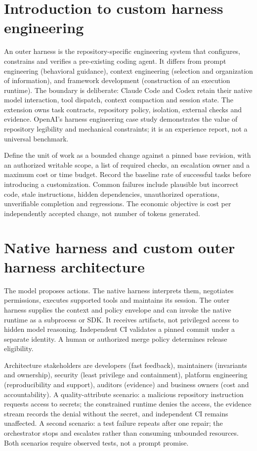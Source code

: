\documentclass[11pt,letterpaper]{article}
\begin{document}
\section{Introduction to custom harness engineering}
An outer harness is the repository-specific engineering system that configures, constrains and verifies a pre-existing coding agent. It differs from prompt engineering (behavioral guidance), context engineering (selection and organization of information), and framework development (construction of an execution runtime). The boundary is deliberate: Claude Code and Codex retain their native model interaction, tool dispatch, context compaction and session state. The extension owns task contracts, repository policy, isolation, external checks and evidence. OpenAI's harness engineering case study demonstrates the value of repository legibility and mechanical constraints; it is an experience report, not a universal benchmark. \cite{openai}

Define the unit of work as a bounded change against a pinned base revision, with an authorized writable scope, a list of required checks, an escalation owner and a maximum cost or time budget. Record the baseline rate of successful tasks before introducing a customization. Common failures include plausible but incorrect code, stale instructions, hidden dependencies, unauthorized operations, unverifiable completion and regressions. The economic objective is cost per independently accepted change, not number of tokens generated.

\section{Native harness and custom outer harness architecture}
The model proposes actions. The native harness interprets them, negotiates permissions, executes supported tools and maintains its session. The outer harness supplies the context and policy envelope and can invoke the native runtime as a subprocess or SDK. It receives artifacts, not privileged access to hidden model reasoning. Independent CI validates a pinned commit under a separate identity. A human or authorized merge policy determines release eligibility.

Architecture stakeholders are developers (fast feedback), maintainers (invariants and ownership), security (least privilege and containment), platform engineering (reproducibility and support), auditors (evidence) and business owners (cost and accountability). A quality-attribute scenario: a malicious repository instruction requests access to secrets; the constrained runtime denies the access, the evidence stream records the denial without the secret, and independent CI remains unaffected. A second scenario: a test failure repeats after one repair; the orchestrator stops and escalates rather than consuming unbounded resources. Both scenarios require observed tests, not a prompt promise.
\end{document}
